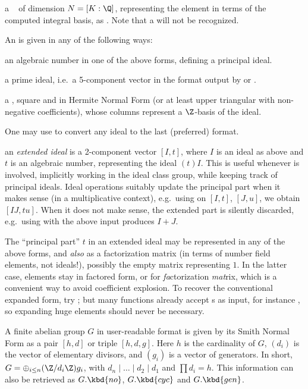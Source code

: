 \item a ~ of dimension $N = [K:\Q]$, representing
the element in terms of the computed integral basis, as
. Note that a 
will not be recognized.
\medskip

\noindent An  is given in any of the following ways:

\item an algebraic number in one of the above forms, defining a principal ideal.

\item a prime ideal, i.e.~a 5-component vector in the format output by
 or .

\item a , square and in Hermite Normal Form (or at least
upper triangular with non-negative coefficients), whose columns represent a
$\Z$-basis of the ideal.

One may use  to convert any ideal to the last (preferred) format.

\item an \emph{extended ideal}  is a 2-component
vector $[I, t]$, where $I$ is an ideal as above and $t$ is an algebraic
number, representing the ideal $(t)I$. This is useful whenever 
is involved, implicitly working in the ideal class group, while keeping track
of principal ideals. Ideal operations suitably update the principal part
when it makes sense (in a multiplicative context), e.g.~using 
on $[I,t]$, $[J,u]$, we obtain $[IJ, tu]$. When it does not make sense, the
extended part is silently discarded, e.g.~using  with the above
input produces $I+J$.

The ``principal part'' $t$ in an extended ideal may be
represented in any of the above forms, and \emph{also} as a factorization
matrix (in terms of number field elements, not ideals!), possibly the empty
matrix \kbd{[;]} representing $1$. In the latter case, elements stay in
factored form, or  for \emph{fa}ctorization \emph{mat}rix, which
is a convenient way to avoid coefficient explosion. To recover the
conventional expanded form, try ; but many functions
already accept s as input, for instance , so
expanding huge elements should never be necessary.


A finite abelian group $G$ in user-readable format is given by its Smith
Normal Form as a pair $[h,d]$ or triple $[h,d,g]$.
Here $h$ is the cardinality of $G$, $(d_i)$ is the vector of elementary
divisors, and $(g_i)$ is a vector of generators. In short,
$G = \oplus_{i\leq n} (\Z/d_i\Z) g_i$, with $d_n \mid \dots \mid d_2 \mid d_1$
and $\prod d_i = h$. This information can also be retrieved as
$G.\kbd{no}$, $G.\kbd{cyc}$ and $G.\kbd{gen}$.

